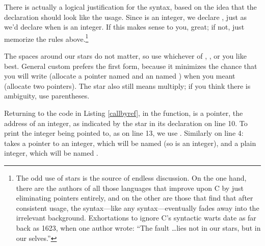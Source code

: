 There is actually a
logical justification for the syntax, based on the
idea that the declaration should look like
the usage. Since  is an integer, we declare ,
just as we'd declare  when  is an integer.
If this makes sense to you, great; if not, just memorize the rules 
above.\footnote{The
odd use of stars is the source of endless discussion. On the one hand,
there are the authors of all those languages that improve upon C by
just eliminating pointers entirely, and on the other are those that find
that after consistent usage, the syntax---like any syntax---eventually
fades away into the irrelevant background.  Exhortations to ignore
C's syntactic warts date as far back as 1623, when one author wrote:
``The fault \dots lies not in our stars, but in our
selves.''}


The spaces around our stars do not matter, so use whichever of , , or  you like best. General
custom prefers the first form, because it minimizes the chance that you
will write  (allocate a pointer named 
and an  named ) when you meant  (allocate two pointers). The star also
still means multiply; if you think there is ambiguity, use parentheses.

Returning to the code in Listing \ref{callbyref}, in the 
function,  is a pointer, the address of an integer, as
indicated by the star in its declaration on line 10. To print the integer
being pointed to, as on line 13, we use .
Similarly on line 4:  takes a pointer to an integer,
which will be named  (so  is an integer),
and a plain integer, which will be named
.

